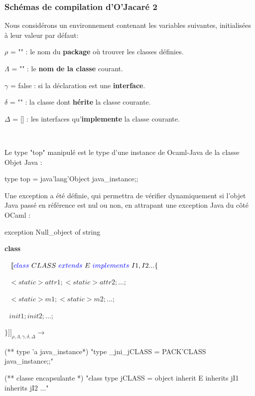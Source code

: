 \documentclass[a4paper, 11pt]{article}
\begin{document}
\subsubsection{Schémas de compilation d'O'Jacaré 2}

\noindent
Nous considérons un environnement contenant les  variables suivantes, initialisées à leur valeur par défaut: 

$\rho$ = "" : le nom du \textbf{package} où trouver les classes définies.

$\Lambda$ = "" : le \textbf{nom de la classe} courant.

$\gamma$ = false : si la déclaration est une \textbf{interface}.

$\delta$ = "" : la classe dont \textbf{hérite} la classe courante.

$\Delta$ = [] : les interfaces qu'\textbf{implemente} la classe courante.
\ %


\ 
\newline

Le type "top" manipulé est le type d'une instance de Ocaml-Java de la classe Objet Java :
\begin{OCamlEx}
type top = java'lang'Object java_instance;;
\end{OCamlEx}

Une exception a été définie, qui permettra de vérifier dynamiquement si l'objet Java passé en référence est nul ou non, en attrapant une exception Java du côté OCaml : 

\begin{OCamlEx}
exception Null_object of string
\end{OCamlEx}


\newpage
\noindent
\textbf{class}

\ 
\newline
\noindent
$[\![ {\color{blue}class}\ CLASS\ 
 {\color{blue}extends}\  E \ 
 {\color{blue}implements}\  I1,I2... \{$

 $ \ \ \ <static> attr1; <static> attr2; ...;$

  $\ \ \ <static> m1; <static> m2; ...;$

  $\ \ \ init1; init2; ...;$

\noindent
 $\} ]\!]_{\rho,\Lambda,\gamma,\delta,\Delta}\longrightarrow$

\begin{OCaml}
(** type 'a java_instance*)
"type _jni_jCLASS = PACK'CLASS java_instance;;"

(** classe encapsulante *)
"class type jCLASS =
   object inherit E
   inherits jI1
   inherits jI2 ..."
\end{OCaml}
\end{document}
